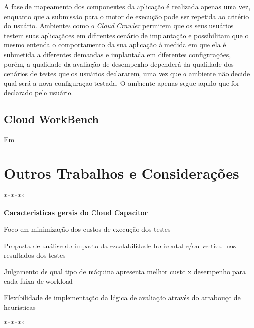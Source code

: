A fase de mapeamento dos componentes da aplicação é realizada apenas uma vez, enquanto que a submissão para o motor de execução pode ser repetida ao critério do usuário. Ambientes como o {\em Cloud Crawler} permitem que os seus usuários testem suas aplicaçãoes em difirentes cenário de implantação e possibilitam que o mesmo entenda o comportamento da sua aplicação à medida em que ela é submetida a diferentes demandas e implantada em diferentes configurações, porém, a qualidade da avaliação de desempenho dependerá da qualidade dos cenários de testes que os usuários declararem, uma vez que o ambiente não decide qual será a nova configuração testada. O ambiente apenas segue aquilo que foi declarado pelo usuário.

\subsection{Cloud WorkBench}   
Em~\cite{scheuner2014cloud}



\section{Outros Trabalhos e Considerações}

******

\textbf{Caracteristicas gerais do Cloud Capacitor}

Foco em minimização dos custos de execução dos testes

Proposta de análise do impacto da escalabilidade horizontal e/ou vertical nos 
resultados dos testes

Julgamento de qual tipo de máquina apresenta melhor custo x desempenho para cada
faixa de workload

Flexibilidade de implementação da lógica de avaliação através do arcabouço de
heurísticas

******

